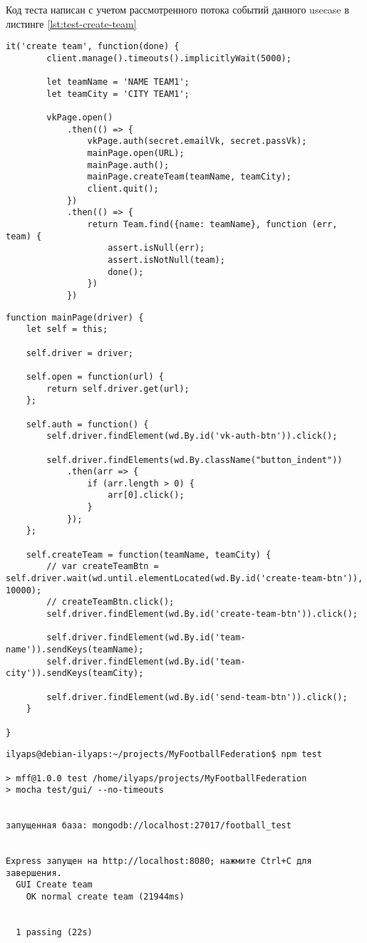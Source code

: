 Код теста написан с учетом рассмотренного потока событий данного usecase в листинге \ref{lst:test-create-team}

\begin{lstlisting}[caption={Тестирование use case создание команды}, label={lst:test-create-team}]
it('create team', function(done) {
        client.manage().timeouts().implicitlyWait(5000);

        let teamName = 'NAME TEAM1';
        let teamCity = 'CITY TEAM1';

        vkPage.open()
            .then(() => {
                vkPage.auth(secret.emailVk, secret.passVk);
                mainPage.open(URL);
                mainPage.auth();
                mainPage.createTeam(teamName, teamCity);
                client.quit();
            })
            .then(() => {
                return Team.find({name: teamName}, function (err, team) {
                    assert.isNull(err);
                    assert.isNotNull(team);
                    done();
                })
            })
\end{lstlisting} 

\begin{lstlisting}[caption={Объект mainPage}]
function mainPage(driver) {
    let self = this;

    self.driver = driver;

    self.open = function(url) {
        return self.driver.get(url);
    };

    self.auth = function() {
        self.driver.findElement(wd.By.id('vk-auth-btn')).click();

        self.driver.findElements(wd.By.className("button_indent"))
            .then(arr => {
                if (arr.length > 0) {
                    arr[0].click();
                }
            });
    };

    self.createTeam = function(teamName, teamCity) {
        // var createTeamBtn = self.driver.wait(wd.until.elementLocated(wd.By.id('create-team-btn')), 10000);
        // createTeamBtn.click();
        self.driver.findElement(wd.By.id('create-team-btn')).click();

        self.driver.findElement(wd.By.id('team-name')).sendKeys(teamName);
        self.driver.findElement(wd.By.id('team-city')).sendKeys(teamCity);

        self.driver.findElement(wd.By.id('send-team-btn')).click();
    }

}
\end{lstlisting} 

\begin{lstlisting}[caption={Результаты тестирования}]
ilyaps@debian-ilyaps:~/projects/MyFootballFederation$ npm test

> mff@1.0.0 test /home/ilyaps/projects/MyFootballFederation
> mocha test/gui/ --no-timeouts


запущенная база: mongodb://localhost:27017/football_test


Express запущен на http://localhost:8080; нажмите Ctrl+C для завершения.
  GUI Create team
    ОК normal create team (21944ms)


  1 passing (22s)
\end{lstlisting} 


